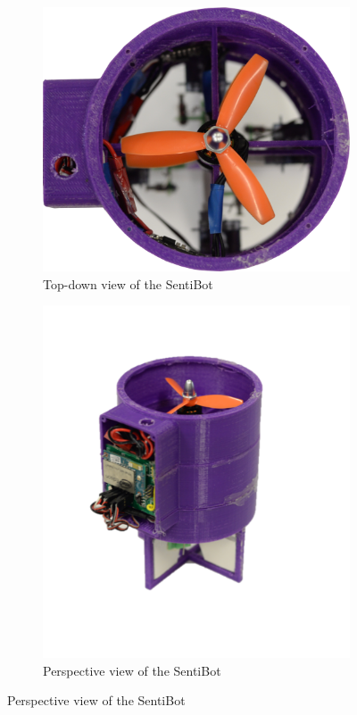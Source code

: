 \documentclass[12pt]{article}
\begin{document}
\begin{figure}
	\centering
	\begin{subfigure}{0.5\textwidth}
		\centering
		\includegraphics[width=0.9\linewidth]{sb-topdown.png}
		\caption{Top-down view of the SentiBot}
		\label{fig:sb-topdown}
	\end{subfigure}%
	\begin{subfigure}{0.5\textwidth}
		\centering
		\includegraphics[width=0.9\linewidth]{sb-side.png}
	\caption{Perspective view of the SentiBot}
	\label{fig:sb-side}
	\end{subfigure}
\end{figure}
\end{document}
